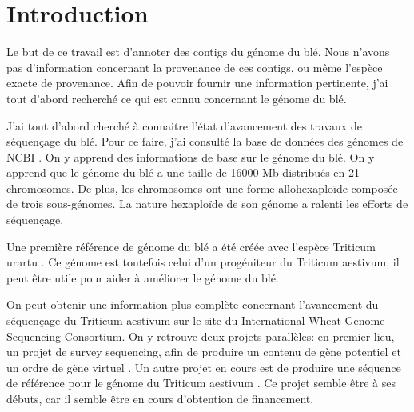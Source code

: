 \documentclass[10.9pt]{article} %
\begin{document}

\tableofcontents %

\newpage %


\section{Introduction}

Le but de ce travail est d'annoter des contigs du génome du blé. Nous n'avons pas d'information concernant
la provenance de ces contigs, ou même l'espèce exacte de provenance. Afin de pouvoir fournir une information 
pertinente, j'ai tout d'abord recherché ce qui est connu concernant le génome du blé.

J'ai tout d'abord cherché à connaitre l'état d'avancement des travaux de séquençage du blé. Pour ce faire, j'ai consulté
la base de données des génomes de NCBI \cite{Triticum eastivum Genome}. On y apprend des informations de base sur le
génome du blé. On y apprend que le génome du blé a une taille de 16000 Mb distribués en 21 chromosomes. De plus, les chromosomes
ont une forme allohexaploïde composée de trois sous-génomes. La nature hexaploïde de son génome a ralenti les efforts de séquençage.

Une première référence de génome du blé a été créée avec l'espèce Triticum urartu \cite{Triticum urartu}. Ce génome est toutefois
celui d'un progéniteur du Triticum aestivum, il peut être utile pour aider à améliorer le génome du blé.

On peut obtenir une information plus complète concernant l'avancement du séquençage du Triticum aestivum sur le site du International
Wheat Genome Sequencing Consortium. On y retrouve deux projets parallèles: en premier lieu, un projet de survey sequencing, afin de
produire un contenu de gène potentiel et un ordre de gène virtuel \cite{IWGSC-survey}. Un autre projet en cours est de produire une
séquence de référence pour le génome du Triticum aestivum \cite{IWGSC-reference}. Ce projet semble être à ses débuts, car il semble
être en cours d'obtention de financement.
\end{document}
